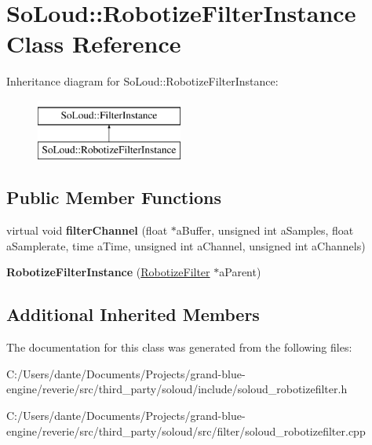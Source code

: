 \hypertarget{class_so_loud_1_1_robotize_filter_instance}{}\section{So\+Loud\+::Robotize\+Filter\+Instance Class Reference}
\label{class_so_loud_1_1_robotize_filter_instance}
Inheritance diagram for So\+Loud\+::Robotize\+Filter\+Instance\+:\begin{figure}[H]
\begin{center}
\leavevmode
\includegraphics[height=2.000000cm]{class_so_loud_1_1_robotize_filter_instance}
\end{center}
\end{figure}
\subsection*{Public Member Functions}
\begin{DoxyCompactItemize}
\item 
\mbox{\label{class_so_loud_1_1_robotize_filter_instance_a16f0a7f779cf6fb62fbe4990fee37795}} 
virtual void {\bfseries filter\+Channel} (float $\ast$a\+Buffer, unsigned int a\+Samples, float a\+Samplerate, time a\+Time, unsigned int a\+Channel, unsigned int a\+Channels)
\item 
\mbox{\label{class_so_loud_1_1_robotize_filter_instance_a8dc8f7b132075e72fbb18764e0593368}} 
{\bfseries Robotize\+Filter\+Instance} (\mbox{\hyperlink{class_so_loud_1_1_robotize_filter}{Robotize\+Filter}} $\ast$a\+Parent)
\end{DoxyCompactItemize}
\subsection*{Additional Inherited Members}


The documentation for this class was generated from the following files\+:\begin{DoxyCompactItemize}
\item 
C\+:/\+Users/dante/\+Documents/\+Projects/grand-\/blue-\/engine/reverie/src/third\+\_\+party/soloud/include/soloud\+\_\+robotizefilter.\+h\item 
C\+:/\+Users/dante/\+Documents/\+Projects/grand-\/blue-\/engine/reverie/src/third\+\_\+party/soloud/src/filter/soloud\+\_\+robotizefilter.\+cpp\end{DoxyCompactItemize}
